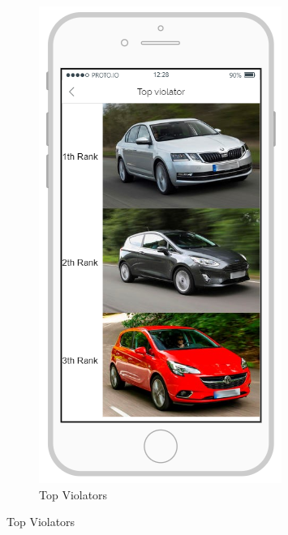 \documentclass{article}
\begin{document}
\begin{figure}[h]
			\begin{subfigure}[h]{0.49\linewidth}
				\includegraphics[width=\linewidth]{images/Top_Violators.png}
				\caption{Top Violators}
				\label{fig:mobile_violators}
			\end{subfigure}
		\end{figure}			
	\FloatBarrier \newpage
\end{document}
